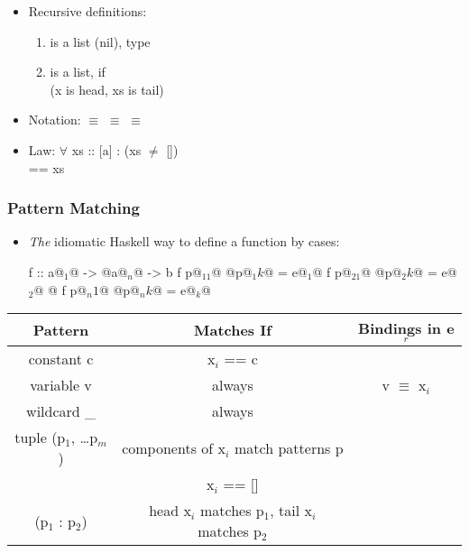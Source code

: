 \begin{itemize}
  \item Recursive definitions:
  \begin{enumerate}
      \item \codeline{[]} is a list (nil), type \codeline{[] :: [a]}
      \item {} is a list, if \\
      (x is head, xs is tail)
  \end{enumerate}
  \item Notation:  $\equiv$  $\equiv$ \codeline{[3,2,1]} $\equiv$ 
  \item Law: $\forall$ xs :: [a] :   \hspace{1cm} (xs $\neq$ []) \\
       == xs
\end{itemize}

\subsubsection{Pattern Matching}

\begin{itemize}
  \item \textit{The} idiomatic Haskell way to define a function by cases:\\
  \begin{Haskell}
f :: a@$_1$@ -> @\dots@ a@$_n$@ -> b
f p@$_11$@ @\dots@ p@$_1k$@ = e@$_1$@
f p@$_21$@ @\dots@ p@$_2k$@ = e@$_2$@
@\dots@
f p@$_n1$@ @\dots@ p@$_nk$@ = e@$_k$@
  \end{Haskell}

\end{itemize}
\begin{center}
\begin{tabular}{|c|c|c|}\hline
\rowcolor{grau}   
Pattern                     & Matches If                              & Bindings in e$_r$   \\\hline
constant c                  & x$_i$ == c                              &                     \\\hline
variable v                  & always                                  & v $\equiv$ x$_i$    \\\hline
wildcard \_                 & always                                  &                     \\\hline
tuple (p$_1$, \dots p$_m$)  & components of x$_i$ match patterns p    &                     \\\hline
[]                          & x$_i$ == []                             &                     \\\hline
(p$_1$ : p$_2$)             & head x$_i$ matches p$_1$, tail x$_i$ matches p$_2$    & \\\hline
\end{tabular}
\end{center}

